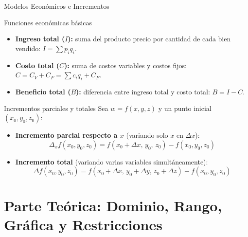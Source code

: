 \documentclass[aspectratio=169, 10pt]{beamer}
\begin{document}
\begin{frame}{Modelos Económicos e Incrementos}
  \begin{block}{Funciones económicas básicas}
    \begin{itemize}
      \item \textbf{Ingreso total ($I$):} suma del producto precio por cantidad de cada bien vendido: $I = \sum p_i q_i$.
      \item \textbf{Costo total ($C$):} suma de costos variables y costos fijos: $C = C_V + C_F = \sum c_i q_i + C_F$.
      \item \textbf{Beneficio total ($B$):} diferencia entre ingreso total y costo total: $B = I - C$.
    \end{itemize}
  \end{block}

  \vspace{0.2cm}
  \begin{block}{Incrementos parciales y totales}
    Sea $w = f(x, y, z)$ y un punto inicial $(x_0, y_0, z_0)$:
    \begin{itemize}
      \item \textbf{Incremento parcial respecto a $x$} (variando solo $x$ en $\Delta x$):
        \[
          \Delta_x f(x_0, y_0, z_0) = f(x_0 + \Delta x,\, y_0,\, z_0) - f(x_0, y_0, z_0)
        \]
      \item \textbf{Incremento total} (variando varias variables simultáneamente):
        \[
          \Delta f(x_0, y_0, z_0) = f(x_0 + \Delta x,\, y_0 + \Delta y,\, z_0 + \Delta z) - f(x_0, y_0, z_0)
        \]
    \end{itemize}
  \end{block}
\end{frame}

\section{Parte Teórica: Dominio, Rango, Gráfica y Restricciones}
\end{document}
